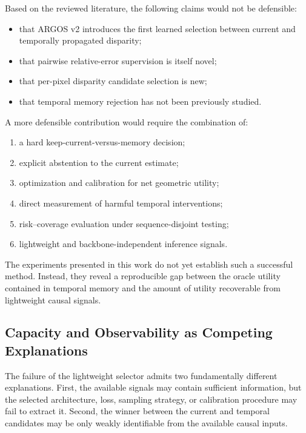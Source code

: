 \documentclass[11pt,a4paper]{article}
\begin{document}
Based on the reviewed literature, the following claims would not be defensible:

\begin{itemize}
    \item that ARGOS v2 introduces the first learned selection between current and temporally propagated disparity;
    \item that pairwise relative-error supervision is itself novel;
    \item that per-pixel disparity candidate selection is new;
    \item that temporal memory rejection has not been previously studied.
\end{itemize}

A more defensible contribution would require the combination of:
\begin{enumerate}
    \item a hard keep-current-versus-memory decision;
    \item explicit abstention to the current estimate;
    \item optimization and calibration for net geometric utility;
    \item direct measurement of harmful temporal interventions;
    \item risk--coverage evaluation under sequence-disjoint testing;
    \item lightweight and backbone-independent inference signals.
\end{enumerate}

The experiments presented in this work do not yet establish such a successful method. Instead, they reveal a reproducible gap between the oracle utility contained in temporal memory and the amount of utility recoverable from lightweight causal signals.

\subsection{Capacity and Observability as Competing Explanations}
\label{sec:capacity_observability}

The failure of the lightweight selector admits two fundamentally different explanations. First, the available signals may contain sufficient information, but the selected architecture, loss, sampling strategy, or calibration procedure may fail to extract it. Second, the winner between the current and temporal candidates may be only weakly identifiable from the available causal inputs.
\end{document}

